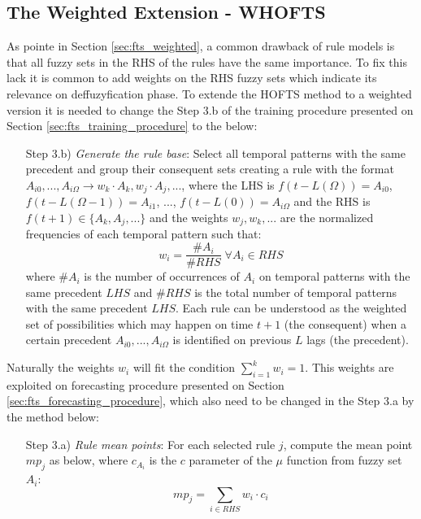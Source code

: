 \subsection{The Weighted Extension - WHOFTS}
\label{sec:fts_whofts}

As pointe in Section \ref{sec:fts_weighted}, a common drawback of rule models is that all fuzzy sets in the RHS of the rules have the same importance. To fix this lack it is common to add weights on the RHS fuzzy sets which indicate its relevance on deffuzyfication phase. To extende the HOFTS method to a weighted version it is needed to change the Step 3.b of the training procedure presented on Section \ref{sec:fts_training_procedure} to the below:

\begin{enumerate}
\item[Step 3.b)] \textit{Generate the rule base}: Select all temporal patterns with the same precedent and group their consequent sets  creating a rule with the format $A_{i0},...,A_{i\Omega} \rightarrow w_k \cdot A_k, w_j \cdot A_j,...$, where the LHS is $f(t - L(\Omega)) = A_{i0}$, $f(t - L(\Omega-1)) = A_{i1}$, ..., $f(t - L(0)) = A_{i\Omega}$ and the RHS is $f(t+1) \in \{A_k, A_j,...\}$ and the weights $w_j, w_k, ...$ are the normalized frequencies of each temporal pattern such that:
\begin{equation}
w_i = \frac{\#A_i}{\#RHS}\; \forall A_i \in RHS    
\end{equation}
where $\#A_i$ is the number of occurrences of $A_i$ on temporal patterns with the same precedent $LHS$ and $\#RHS$ is the total number of temporal patterns with the same precedent $LHS$. Each rule can be understood as the weighted set of possibilities which may happen on time $t+1$ (the consequent) when a certain precedent $A_{i0},...,A_{i\Omega}$ is identified on previous $L$ lags (the precedent).
\end{enumerate}

Naturally the weights $w_i$ will fit the condition $\sum_{i=1}^k w_i = 1$. This weights are exploited on forecasting procedure presented on Section \ref{sec:fts_forecasting_procedure}, which also need to be changed in the Step 3.a by the method below:

\begin{enumerate}
\item [Step 3.a)] \textit{Rule mean points}: For each selected rule $j$, compute the mean point $mp_j$ as below, where $c_{A_i}$ is the $c$ parameter of the $\mu$ function from fuzzy set $A_i$:
\begin{equation}
mp_j = \sum_{i \in RHS} w_i \cdot c_i
\end{equation}
\end{enumerate}

